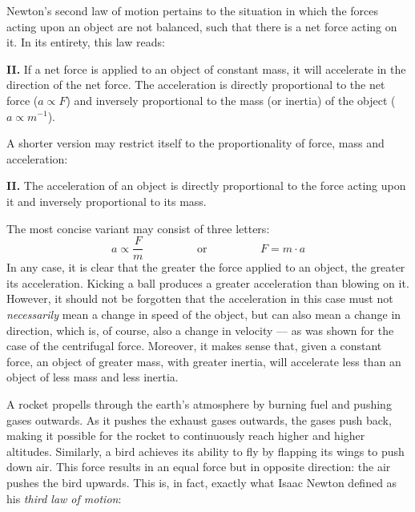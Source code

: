 
Newton's second law of motion pertains to the situation in which the forces acting upon an object are not balanced, such that there is a net force acting on it. In its entirety, this law reads:

\begin{displayquote}
	\textbf{II.} If a net force is applied to an object of constant mass, it will accelerate in the direction of the net force. The acceleration is directly proportional to the net force ($a \propto F$) and inversely proportional to the mass (or inertia) of the object ($a \propto m^{-1}$).
\end{displayquote}

A shorter version may restrict itself to the proportionality of force, mass and acceleration:

\begin{displayquote}
	\textbf{II.} The acceleration of an object is directly proportional to the force acting upon it and inversely proportional to its mass.
\end{displayquote}

The most concise variant may consist of three letters: $$a \propto \frac{F}{m} \hspace{2cm} \text{or} \hspace{2cm} F = m \cdot a$$ In any case, it is clear that the greater the force applied to an object, the greater its acceleration. Kicking a ball produces a greater acceleration than blowing on it. However, it should not be forgotten that the acceleration in this case must not \emph{necessarily} mean a change in speed of the object, but can also mean a change in direction, which is, of course, also a change in velocity --- as was shown for the case of the centrifugal force. Moreover, it makes sense that, given a constant force, an object of greater mass, with greater inertia, will accelerate less than an object of less mass and less inertia.


A rocket propells through the earth's atmosphere by burning fuel and pushing gases outwards. As it pushes the exhaust gases outwards, the gases push back, making it possible for the rocket to continuously reach higher and higher altitudes. Similarly, a bird achieves its ability to fly by flapping its wings to push down air. This force results in an equal force but in opposite direction: the air pushes the bird upwards. This is, in fact, exactly what Isaac Newton defined as his \emph{third law of motion}:

